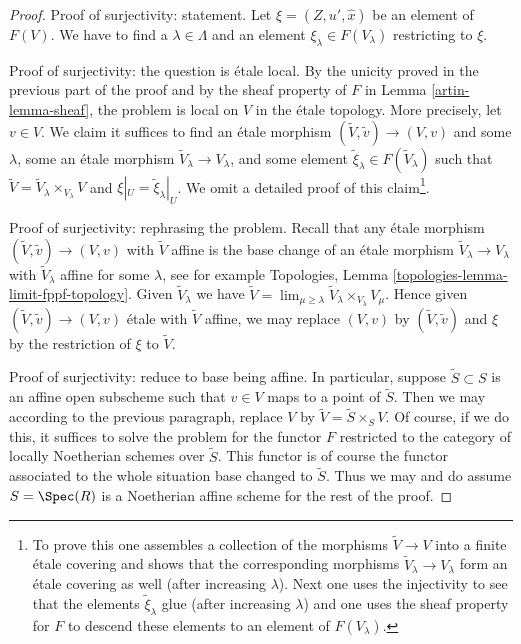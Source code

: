 \begin{proof}
\medskip\noindent
Proof of surjectivity: statement.
Let $\xi = (Z, u', \hat x)$ be an element of $F(V)$.
We have to find a $\lambda \in \Lambda$ and an element
$\xi_\lambda \in F(V_\lambda)$ restricting to $\xi$.

\medskip\noindent
Proof of surjectivity: the question is \'etale local.
By the unicity proved in the previous part of the proof and by the
sheaf property of $F$ in Lemma \ref{artin-lemma-sheaf}, the problem
is local on $V$ in the \'etale topology. More precisely, let $v \in V$.
We claim it suffices to find an \'etale morphism
$(\tilde V, \tilde v) \to (V, v)$ and some
$\lambda$, some an \'etale morphism $\tilde V_\lambda \to V_\lambda$,
and some element $\tilde \xi_\lambda \in F(\tilde V_\lambda)$ such that
$\tilde V = \tilde V_\lambda \times_{V_\lambda} V$
and $\xi|_U = \tilde \xi_\lambda|_U$. We omit a detailed proof of
this claim\footnote{To prove this
one assembles a collection of the morphisms $\tilde V \to V$
into a finite \'etale covering and shows that the corresponding morphisms
$\tilde V_\lambda \to V_\lambda$ form an \'etale covering as well (after
increasing $\lambda$). Next one uses the injectivity to see that
the elements $\tilde \xi_\lambda$ glue (after increasing $\lambda$)
and one uses the sheaf property for $F$ to descend these
elements to an element of $F(V_\lambda)$.}.

\medskip\noindent
Proof of surjectivity: rephrasing the problem.
Recall that any \'etale morphism $(\tilde V, \tilde v) \to (V, v)$
with $\tilde V$ affine is the base change of an \'etale morphism
$\tilde V_\lambda \to V_\lambda$ with $\tilde V_\lambda$ affine
for some $\lambda$, see for example
Topologies, Lemma \ref{topologies-lemma-limit-fppf-topology}.
Given $\tilde V_\lambda$ we have
$\tilde V = \lim_{\mu \geq \lambda} \tilde V_\lambda \times_{V_\lambda} V_\mu$.
Hence given $(\tilde V, \tilde v) \to (V, v)$ \'etale with $\tilde V$ affine,
we may replace $(V, v)$ by $(\tilde V, \tilde v)$ and $\xi$ by
the restriction of $\xi$ to $\tilde V$.

\medskip\noindent
Proof of surjectivity: reduce to base being affine. In particular,
suppose $\tilde S \subset S$ is an affine open subscheme such
that $v \in V$ maps to a point of $\tilde S$. Then we may according
to the previous paragraph, replace $V$ by $\tilde V = \tilde S \times_S V$.
Of course, if we do this, it suffices to solve the problem
for the functor $F$ restricted to the category of locally Noetherian
schemes over $\tilde S$. This functor is of course the functor
associated to the whole situation base changed to $\tilde S$.
Thus we may and do assume $S = \Spec(R)$ is a Noetherian affine scheme
for the rest of the proof.


\end{proof}
